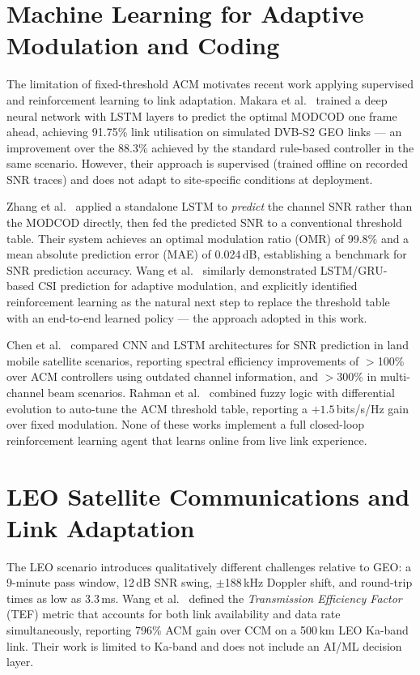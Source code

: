\documentclass[12pt,a4paper]{report}
\begin{document}
\section{Machine Learning for Adaptive Modulation and Coding}

The limitation of fixed-threshold ACM motivates recent work applying supervised
and reinforcement learning to link adaptation.  Makara et al.~\cite{makara2024}
trained a deep neural network with LSTM layers to predict the optimal MODCOD
one frame ahead, achieving 91.75\% link utilisation on simulated DVB-S2 GEO
links --- an improvement over the 88.3\% achieved by the standard rule-based
controller in the same scenario.  However, their approach is supervised
(trained offline on recorded SNR traces) and does not adapt to site-specific
conditions at deployment.

Zhang et al.~\cite{zhang2022} applied a standalone LSTM to \emph{predict} the
channel SNR rather than the MODCOD directly, then fed the predicted SNR to a
conventional threshold table.  Their system achieves an optimal modulation
ratio (OMR) of 99.8\% and a mean absolute prediction error (MAE) of 0.024\,dB,
establishing a benchmark for SNR prediction accuracy.  Wang et al.~\cite{wang2019wcnc}
similarly demonstrated LSTM/GRU-based CSI prediction for adaptive modulation,
and explicitly identified reinforcement learning as the natural next step to
replace the threshold table with an end-to-end learned policy --- the approach
adopted in this work.

Chen et al.~\cite{mdpi2024snr} compared CNN and LSTM architectures for SNR
prediction in land mobile satellite scenarios, reporting spectral efficiency
improvements of $>$100\% over ACM controllers using outdated channel information,
and $>$300\% in multi-channel beam scenarios.  Rahman et al.~\cite{rahman2020}
combined fuzzy logic with differential evolution to auto-tune the ACM threshold
table, reporting a $+1.5$\,bits/s/Hz gain over fixed modulation.  None of these
works implement a full closed-loop reinforcement learning agent that learns
online from live link experience.

\section{LEO Satellite Communications and Link Adaptation}

The LEO scenario introduces qualitatively different challenges relative to GEO:
a 9-minute pass window, 12\,dB SNR swing, $\pm$188\,kHz Doppler shift, and
round-trip times as low as 3.3\,ms.  Wang et al.~\cite{wang2022sensors} defined
the \emph{Transmission Efficiency Factor} (TEF) metric that accounts for both
link availability and data rate simultaneously, reporting 796\% ACM gain over
CCM on a 500\,km LEO Ka-band link.  Their work is limited to Ka-band and does
not include an AI/ML decision layer.
\end{document}
